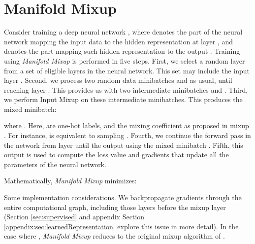 \documentclass{article} \usepackage[preprint]{nips_2018}
\newcommand{\manifoldmixup}{\textit{Manifold Mixup}}
\newcommand{\inputmixup}{Input Mixup}
\begin{document}
\iffalse
\begin{figure*}[htp]
\centering
\texttt{[image: figures/2d\_analytical/mm\_new\_figure\_2\_a.png]}
\caption{The same experimental setup as Figure~\ref{fig:2dbottleneck}, but using a variety of competitive regularizers.  This shows that the effect of concentrating the hidden states for each class and providing a broad region of low confidence between the regions is not accomplished by the other regularizers (although input space mixup does produce regions of low confidence, it does not flatten the class-specific state distribution).  Noise refers to gaussian noise in the bottleneck layer, dropout refers to dropout of 50\% in all layers except the bottleneck itself (due to its low dimensionality), and batch normalization refers to batch normalization in all layers.  Black dots are the hidden representation of the inputs sampled uniformly from the range of the input space.  }
\label{appendix:figure:variousregs}
\end{figure*}
\fi

\section{Manifold Mixup}
\label{sec:manifold_mixup}

Consider training a deep neural network , where  denotes the part of the neural network mapping the input data to the hidden representation at layer , and  denotes the part mapping such hidden representation to the output . 
Training  using \manifoldmixup{} is performed in five steps.
First, we select a random layer  from a set of eligible layers  in the neural network. This set may include the input layer .
Second, we process two random data minibatches  and  as usual, until reaching layer .
This provides us with two intermediate minibatches  and .
Third, we perform \inputmixup{} \citep{zhang2017mixup} on these intermediate minibatches.
This produces the mixed minibatch:

where .
Here,  are one-hot labels, and the mixing coefficient  as proposed in mixup \citep{zhang2017mixup}.
For instance,  is equivalent to sampling . 
Fourth, we continue the forward pass in the network from layer  until the output using the mixed minibatch .
Fifth, this output is used to compute the loss value and gradients that update all the parameters of the neural network.

Mathematically, \manifoldmixup{} minimizes:

Some implementation considerations.
We backpropagate gradients through the entire computational graph, including those layers before the mixup layer  (Section \ref{sec:supervised} and appendix Section \ref{appendix:sec:learnedRepresentation} explore this issue in more detail).
In the case where , \manifoldmixup{} reduces to the original mixup algorithm of \citet{zhang2017mixup}.  
\end{document}
